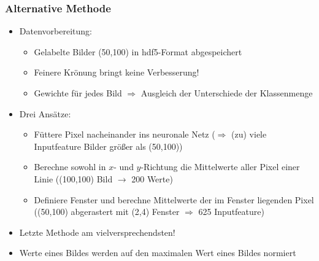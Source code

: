 \documentclass[aspectratio=1610, professionalfonts, 9pt]{beamer}
\begin{document}
\begin{frame}
\frametitle{Alternative Methode}

\begin{itemize}
 \item[\textbullet] Datenvorbereitung:
 \begin{itemize}
  \item Gelabelte Bilder (50,100) in hdf5-Format abgespeichert
  \item Feinere Krönung bringt keine Verbesserung!
  \item Gewichte für jedes Bild $\Rightarrow$ Ausgleich der Unterschiede der Klassenmenge
 \end{itemize}
\end{itemize}
\vspace{0.5cm}

\begin{itemize}
 \item[\textbullet] Drei Ansätze:
 \begin{itemize}
  \item Füttere Pixel nacheinander ins neuronale Netz ($\Rightarrow$ (zu) viele Inputfeature Bilder größer als (50,100))
  \item Berechne sowohl in $x$- und $y$-Richtung die Mittelwerte aller Pixel einer Linie ((100,100) Bild $\rightarrow$ 200 Werte)
  \item Definiere Fenster und berechne Mittelwerte der im Fenster liegenden Pixel ((50,100) abgerastert mit (2,4) Fenster $\Rightarrow$ 625 Inputfeature)
 \end{itemize}
\vspace{0.5cm}
\item[\textbullet] Letzte Methode am vielversprechendsten!
\vspace{0.5cm}
\item[\textbullet] Werte eines Bildes werden auf den maximalen Wert eines Bildes normiert
\end{itemize}
\end{frame}
\end{document}
